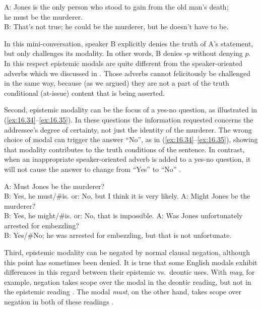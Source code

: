 \ea \label{ex:16.33}
A: Jones is the only person who stood to gain from the old man’s death;\\
\hspace{1cm} he must be the murderer.\\
B: That’s not true; he could be the murderer, but he doesn’t have to be.
\z


In this mini-conversation, speaker B explicitly denies the truth of A’s statement, but only challenges its modality. In other words, B denies $\square p$ without denying $p$. In this respect epistemic modals are quite different from the speaker-oriented adverbs which we discussed in . Those adverbs cannot felicitously be challenged in the same way, because (as we argued) they are not a part of the truth conditional (at-issue) content that is being asserted.



Second, epistemic modality can be the focus of a yes-no question, as illustrated in (\ref{ex:16.34}--\ref{ex:16.35}). In these questions the information requested concerns the addressee’s degree of certainty, not just the identity of the murderer. The wrong choice of modal can trigger the answer “No”, as in (\ref{ex:16.34}--\ref{ex:16.35}), showing that modality contributes to the truth conditions of the sentence. In contrast, when an inappropriate speaker-oriented adverb is added to a yes-no question, it will not cause the answer to change from “Yes” to “No” .


\ea \label{ex:16.34}
A: Must Jones be the murderer?\\
B: Yes, he must/\#is.  or: No, but I think it is very likely.
\ex \label{ex:16.35}
A: Might Jones be the murderer?\\
B: Yes, he might/\#is.  or: No, that is impossible.
\ex \label{ex:16.36}
A: Was Jones unfortunately arrested for embezzling?\\
B: Yes/\#No; he was arrested for embezzling, but that is not unfortunate.
\z


Third, epistemic modality can be negated by normal clausal negation, although this point has sometimes been denied. It is true that some English modals exhibit differences in this regard between their epistemic vs.~deontic uses. With \textit{may}, for example, negation takes scope over the modal in the deontic reading, but not in the epistemic reading . The modal \textit{must}, on the other hand, takes scope over negation in both of these readings .


